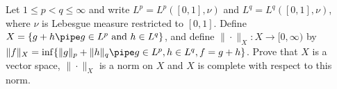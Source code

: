 Let $1\leq p<q\leq \infty$ and write $L^p=L^p([0,1],\nu)$ and
$L^q=L^q([0,1],\nu)$, where $\nu$ is Lebesgue measure restricted to
$[0,1]$. Define $X=\{g+h\pipe g\in L^p \text{\ and\ } h\in L^q\}$, and
define $\|\cdot \|_X:X\rightarrow [0,\infty)$ by
$\|f\|_X=\inf\{\|g\|_p+\|h\|_q\pipe g\in L^p, h\in L^q, f=g+h\}$.
Prove that $X$ is a vector space, $\|\cdot \|_X$ is a norm on $X$ and
$X$ is complete with respect to this norm.
